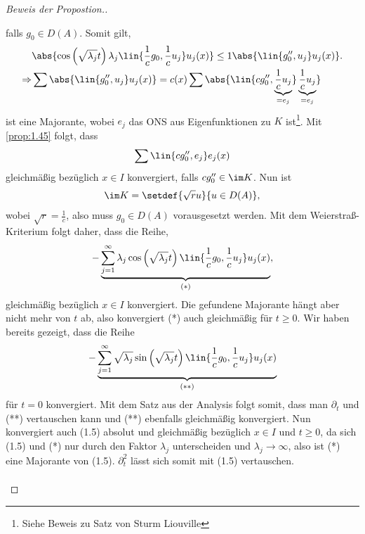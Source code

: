 \begin{proof}[Beweis der Propostion.]
\begin{enumerate}[label=\arabic{*}.)]
falls $g_0\in D(A)$. Somit gilt,
\begin{align*}
&\abs{\cos\left(\sqrt{\lambda_j}t\right)\lambda_j\lin{\frac{1}{c}g_0,\frac{1}{c}u_j}u_j(x)}
\le 1\abs{\lin{g_0'',u_j}u_j(x)}.\\
\Rightarrow & \sum \abs{\lin{g_0'',u_j}u_j(x)}
= c(x)\sum
\abs{\lin{cg_0'',\underbrace{\frac{1}{c}u_j}_{=e_j}}\underbrace{\frac{1}{c}u_j}_{=e_j}}
\end{align*}
ist eine Majorante, wobei $e_j$ das ONS aus Eigenfunktionen zu $K$
ist\footnote{Siehe Beweis zu Satz von Sturm Liouville}. Mit \ref{prop:1.45} folgt, dass
\begin{align*}
\sum\lin{cg_0'',e_j}e_j(x)
\end{align*} 
gleichmäßig bezüglich $x\in I$ konvergiert, falls $cg_0''\in\im K$. Nun ist
\begin{align*}
\im K = \setdef{\sqrt{r}u}{u\in D(A)},
\end{align*}
wobei $\sqrt{r}=\frac{1}{c}$, also muss $g_0\in D(A)$
vorausgesetzt werden. Mit dem Weierstraß-Kriterium folgt daher, dass die Reihe,
\begin{align*}
-\underbrace{\sum\limits_{j=1}^\infty \lambda_j
\cos\left(\sqrt{\lambda_j}t\right)\lin{\frac{1}{c}g_0,\frac{1}{c}u_j}u_j(x)}_{(*)},
\end{align*}
gleichmäßig bezüglich $x\in I$ konvergiert. Die gefundene Majorante hängt aber
nicht mehr von $t$ ab, also konvergiert (*) auch gleichmäßig für $t\ge 0$. Wir
haben bereits gezeigt, dass die Reihe
\begin{align*}
-\underbrace{\sum\limits_{j=1}^\infty
\sqrt{\lambda_j}\sin\left(\sqrt{\lambda_j}t\right)\lin{\frac{1}{c}g_0,\frac{1}{c}u_j}u_j(x)}_{(**)}
\end{align*}
für $t=0$ konvergiert. Mit dem Satz aus der Analysis folgt somit, dass man
$\partial_t$ und (**) vertauschen kann und (**) ebenfalls gleichmäßig
konvergiert. Nun konvergiert auch (1.5) absolut und gleichmäßig bezüglich
$x\in I$ und $t\ge 0$, da sich (1.5) und (*) nur durch den Faktor $\lambda_j$
unterscheiden und $\lambda_j\to\infty$, also ist (*) eine Majorante von (1.5). $\partial_t^2$
lässt sich somit mit (1.5) vertauschen.
\begin{align*}

\end{align*}
\end{enumerate}
\end{proof}
